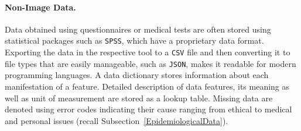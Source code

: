 \documentclass[journal]{style/vgtc} 			          %
\begin{document}
\paragraph{Non-Image Data. }
%
%
Data obtained using questionnaires or medical tests are often stored using statistical packages such as \texttt{SPSS}, which have a proprietary data format. %
%
Exporting the data in the respective tool to a \texttt{CSV} file and then converting it to file types that are easily manageable, such as \texttt{JSON}, makes it readable for modern programming languages.
%
%
A data dictionary stores information about each manifestation of a feature.
%
Detailed description of data features, its meaning as well as unit of measurement are stored as a lookup table.
%
%
Missing data are denoted using error codes indicating their cause ranging from ethical to medical and personal issues (recall Subsection~\ref{EpidemiologicalData}).
%
\end{document}
